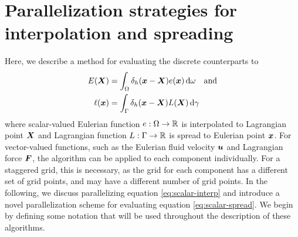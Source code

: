 \section{Parallelization strategies for interpolation and spreading} \label{sec:parallel}

Here, we describe a method for evaluating the discrete counterparts to
\begin{align}
    \label{eq:scalar-interp}
    E(\X) &= \int_\domain \Dirac_h(\x-\X)e(\x) \d\omega \quad \text{and}\\
    \label{eq:scalar-spread}
    \ell(\x) &= \int_\interface \Dirac_h(\x-\X)L(\X) \d\gamma
\end{align}
where scalar-valued Eulerian function $e:\Omega\to\mathbb{R}$ is interpolated to
Lagrangian point $\boldsymbol{X}$ and Lagrangian function $L:\Gamma\to\mathbb{R}$ is spread to
Eulerian point $\boldsymbol{x}$. For vector-valued functions, such as the Eulerian fluid velocity
$\boldsymbol{u}$ and Lagrangian force $\boldsymbol{F}$, the algorithm can be applied to each component
individually. For a staggered grid, this is necessary, as the grid for each component has
a different set of grid points, and may have a different number of grid points. In the
following, we discuss parallelizing equation \eqref{eq:scalar-interp} and introduce a
novel parallelization scheme for evaluating equation \eqref{eq:scalar-spread}. We begin
by defining some notation that will be used throughout the description of these
algorithms.






